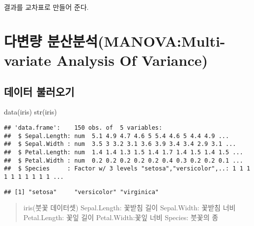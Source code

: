 \documentclass[
]{article}
\newenvironment{Shaded}{\begin{snugshade}}{\end{snugshade}}
\newcommand{\FunctionTok}[1]{\textcolor[rgb]{0.00,0.00,0.00}{#1}}
\newcommand{\NormalTok}[1]{#1}
\newcommand{\SpecialCharTok}[1]{\textcolor[rgb]{0.00,0.00,0.00}{#1}}
\begin{document}
결과를 교차표로 만들어 준다.

\hypertarget{uxb2e4uxbcc0uxb7c9-uxbd84uxc0b0uxbd84uxc11dmanovamulti-variate-analysis-of-variance}{%
\section{다변량 분산분석(MANOVA:Multi-variate Analysis Of Variance)}\label{uxb2e4uxbcc0uxb7c9-uxbd84uxc0b0uxbd84uxc11dmanovamulti-variate-analysis-of-variance}}

\hypertarget{uxb370uxc774uxd130-uxbd88uxb7ecuxc624uxae30-5}{%
\subsection{데이터 불러오기}\label{uxb370uxc774uxd130-uxbd88uxb7ecuxc624uxae30-5}}

\begin{Shaded}
\begin{Highlighting}[]
\FunctionTok{data}\NormalTok{(iris)}
\FunctionTok{str}\NormalTok{(iris)}
\end{Highlighting}
\end{Shaded}

\begin{verbatim}
## 'data.frame':    150 obs. of  5 variables:
##  $ Sepal.Length: num  5.1 4.9 4.7 4.6 5 5.4 4.6 5 4.4 4.9 ...
##  $ Sepal.Width : num  3.5 3 3.2 3.1 3.6 3.9 3.4 3.4 2.9 3.1 ...
##  $ Petal.Length: num  1.4 1.4 1.3 1.5 1.4 1.7 1.4 1.5 1.4 1.5 ...
##  $ Petal.Width : num  0.2 0.2 0.2 0.2 0.2 0.4 0.3 0.2 0.2 0.1 ...
##  $ Species     : Factor w/ 3 levels "setosa","versicolor",..: 1 1 1 1 1 1 1 1 1 1 ...
\end{verbatim}

\begin{Shaded}
\end{Shaded}

\begin{verbatim}
## [1] "setosa"     "versicolor" "virginica"
\end{verbatim}

\begin{quote}
iris(붓꽃 데이터셋)
Sepal.Length: 꽃받침 길이
Sepal.Width: 꽃받침 너비
Petal.Length: 꽃잎 길이
Petal.Width:꽃잎 너비
Species: 붓꽃의 종
\end{quote}
\end{document}
